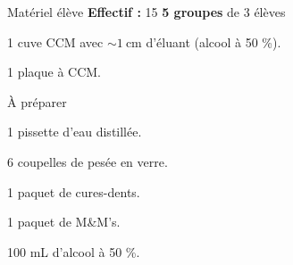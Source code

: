 
\begin{boiteMateriel}{Matériel élève}
  \textbf{Effectif :} 15
  \qq{}\qq{}
  \flecheLongue \textbf{5 groupes} de 3 élèves
  
  \begin{protocole}
    \item 1 cuve CCM avec $\sim \qty{1}{\cm}$ d'éluant (alcool à 50 \%).
    \item 1 plaque à CCM.
  \end{protocole}
\end{boiteMateriel}


\begin{boiteMateriel}{À préparer}
  \begin{protocole}
    \item 1 pissette d'eau distillée.
    \item 6 coupelles de pesée en verre.
    \item 1 paquet de cures-dents.
    \item 1 paquet de M\&M's.
    \item 100 mL d'alcool à 50 \%.
  \end{protocole}
\end{boiteMateriel}